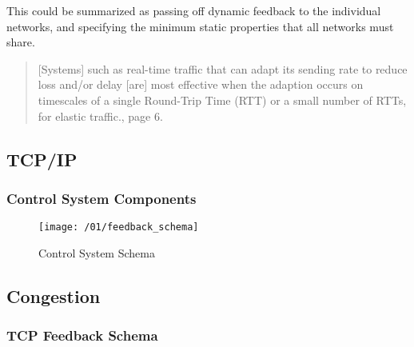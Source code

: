 This could be summarized as passing off dynamic feedback to the individual networks, and specifying
the minimum static properties that all networks must share. 


\begin{quote}
    [Systems] such as real-time traffic that can adapt its sending rate to reduce loss and/or delay
    [are] most effective when the adaption occurs on timescales of a single Round-Trip Time (RTT) or
    a small number of RTTs, for elastic traffic.\cite{rfc7567}, page 6.
\end{quote}

\subsection{TCP/IP}




% 

\subsubsection{Control System Components}

\begin{figure}
\texttt{[image: /01/feedback\_schema]}
\caption{Control System Schema}
\label{fig:feedback_schema}
\end{figure}

\subsection{Congestion}

\subsubsection{TCP Feedback Schema} 

